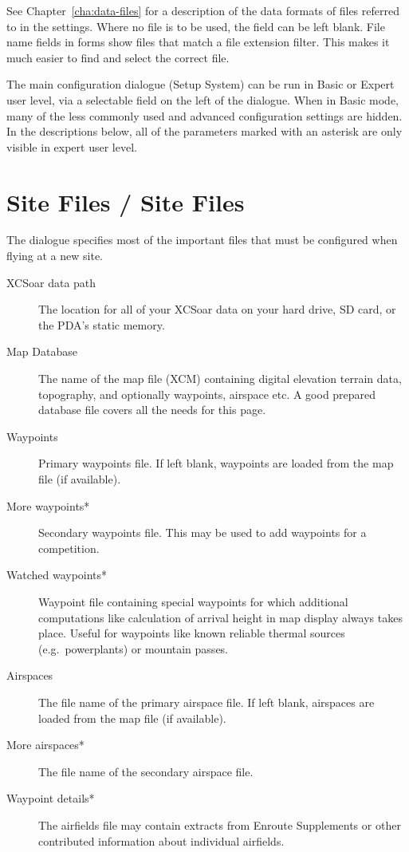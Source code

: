 See Chapter~\ref{cha:data-files} for a description of the data formats
of files referred to in the settings.  Where no file is to be used,
the field can be left blank.  File name fields in forms show files
that match a file extension filter.  This makes it much easier to find
and select the correct file.

The main configuration dialogue (Setup System) can be run in Basic or
Expert user level, via a selectable field on the left of the dialogue.
When in Basic mode, many of the less commonly used and advanced
configuration settings are hidden.  In the descriptions below,
all of the parameters marked with an asterisk are only visible in
expert user level. 

\section{Site Files / Site Files}
The dialogue specifies most of the important files that must be
configured when flying at a new site.

\begin{description}
\item[XCSoar data path]  The location for all of your XCSoar data on your hard drive, 
  SD card, or the PDA's static memory.
\item[Map Database]  The name of the map file (XCM) containing digital elevation
  terrain data, topography, and optionally waypoints, airspace etc. A good
  prepared database file covers all the needs for this page.
\item[Waypoints]  Primary waypoints file.  If left blank, waypoints are loaded
  from the map file (if available).
\item[More waypoints*]  Secondary waypoints file.  This may be used to add 
  waypoints for a competition.
\item[Watched waypoints*]  Waypoint file containing special waypoints for 
  which additional computations   like calculation of arrival height in map 
  display always takes place. Useful for waypoints   like known reliable 
  thermal sources (e.g.\ powerplants) or mountain passes.
\item[Airspaces]  The file name of the primary airspace file.  If left blank,
  airspaces are loaded from the map file (if available).
\item[More airspaces*]  The file name of the secondary airspace file.
\item[Waypoint details*]  The airfields file may contain extracts from 
  Enroute Supplements or other contributed information about individual airfields.
\end{description}

